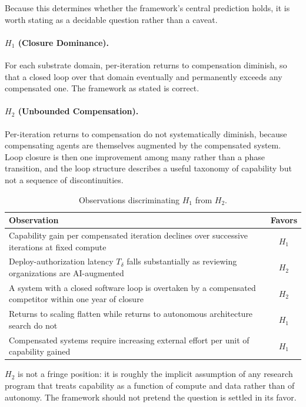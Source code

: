 \documentclass[11pt]{article}
\begin{document}
Because this determines whether the framework's central prediction holds, it is worth stating as a decidable question rather than a caveat.

\paragraph{$H_1$ (Closure Dominance).} For each substrate domain, per-iteration returns to compensation diminish, so that a closed loop over that domain eventually and permanently exceeds any compensated one. The framework as stated is correct.

\paragraph{$H_2$ (Unbounded Compensation).} Per-iteration returns to compensation do not systematically diminish, because compensating agents are themselves augmented by the compensated system. Loop closure is then one improvement among many rather than a phase transition, and the loop structure describes a useful taxonomy of capability but not a sequence of discontinuities.

\begin{table}[h]
\centering
\footnotesize
\begin{tabular}{@{}L{10.4cm}c@{}}
\toprule
Observation & Favors \\
\midrule
Capability gain per compensated iteration declines over successive iterations at fixed compute & $H_1$ \\
Deploy-authorization latency $T_\delta$ falls substantially as reviewing organizations are AI-augmented & $H_2$ \\
A system with a closed software loop is overtaken by a compensated competitor within one year of closure & $H_2$ \\
Returns to scaling flatten while returns to autonomous architecture search do not & $H_1$ \\
Compensated systems require increasing external effort per unit of capability gained & $H_1$ \\
\bottomrule
\end{tabular}
\caption{Observations discriminating $H_1$ from $H_2$.}
\end{table}

$H_2$ is not a fringe position: it is roughly the implicit assumption of any research program that treats capability as a function of compute and data rather than of autonomy. The framework should not pretend the question is settled in its favor.
\end{document}
